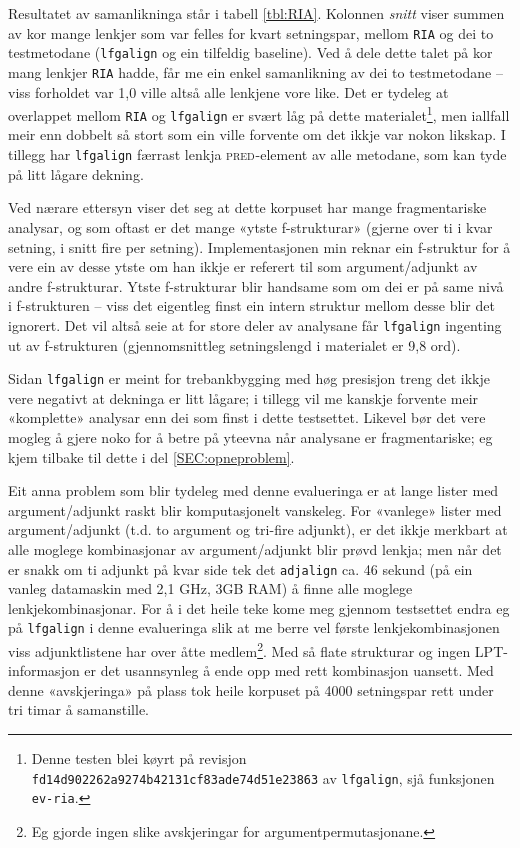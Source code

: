 \documentclass[11pt,a4paper,oneside,draft]{book}
\newcommand{\F}[2]{\textsc{#1}\ensuremath{_{#2}}}
\newcommand{\PRED}{\F{pred}{}}
\begin{document}
 Resultatet av samanlikninga står i tabell \ref{tbl:RIA}. Kolonnen
 \emph{snitt} viser summen av kor mange lenkjer som var felles for kvart
 setningspar, mellom \texttt{RIA} og dei to testmetodane (\texttt{lfgalign} og ein
 tilfeldig baseline). Ved å dele dette talet på kor mang lenkjer \texttt{RIA}
 hadde, får me ein enkel samanlikning av dei to testmetodane -- viss
 forholdet var 1,0 ville altså alle lenkjene vore like.  Det er
 tydeleg at overlappet mellom \texttt{RIA} og \texttt{lfgalign} er svært låg på
 dette materialet\footnote{Denne testen blei køyrt på revisjon
        \texttt{fd14d902262a9274b42131cf83ade74d51e23863} av \texttt{lfgalign},
        sjå funksjonen \texttt{ev-ria}. }, men iallfall meir enn dobbelt så stort som
 ein ville forvente om det ikkje var nokon likskap. I tillegg har
 \texttt{lfgalign} færrast lenkja \PRED{}-element av alle metodane, som kan
 tyde på litt lågare dekning.

 Ved nærare ettersyn viser det seg at dette korpuset har mange
 fragmentariske analysar, og som oftast er det mange «ytste
 f-strukturar» (gjerne over ti i kvar setning, i snitt fire per
 setning). Implementasjonen min reknar ein f-struktur for å vere ein
 av desse ytste om han ikkje er referert til som argument/adjunkt av
 andre f-strukturar. Ytste f-strukturar blir handsame som om dei er på
 same nivå i f-strukturen -- viss det eigentleg finst ein intern
 struktur mellom desse blir det ignorert. Det vil altså seie at for
 store deler av analysane får \texttt{lfgalign} ingenting ut av f-strukturen
 (gjennomsnittleg setningslengd i materialet er 9,8 ord).

 Sidan \texttt{lfgalign} er meint for trebankbygging med høg presisjon treng
 det ikkje vere negativt at dekninga er litt lågare; i tillegg vil me
 kanskje forvente meir «komplette» analysar enn dei som finst i dette
 testsettet. Likevel bør det vere mogleg å gjere noko for å betre på
 yteevna når analysane er fragmentariske; eg kjem tilbake til dette i
 del \ref{SEC:opneproblem}.

 Eit anna problem som blir tydeleg med denne evalueringa er at lange
 lister med argument/adjunkt raskt blir komputasjonelt vanskeleg. For
 «vanlege» lister med argument/adjunkt (t.d. to argument og tri-fire
 adjunkt), er det ikkje merkbart at alle moglege kombinasjonar av
 argument/adjunkt blir prøvd lenkja; men når det er snakk om ti
 adjunkt på kvar side tek det \texttt{adjalign} ca. 46 sekund (på ein vanleg
 datamaskin med 2,1 GHz, 3GB RAM) å finne alle moglege
 lenkjekombinasjonar. For å i det heile teke kome meg gjennom
 testsettet endra eg på \texttt{lfgalign} i denne evalueringa slik at me
 berre vel første lenkjekombinasjonen viss adjunktlistene har over
 åtte medlem\footnote{Eg gjorde ingen slike avskjeringar for argumentpermutasjonane. }. Med så flate strukturar og ingen LPT-informasjon
 er det usannsynleg å ende opp med rett kombinasjon uansett. Med denne
 «avskjeringa» på plass tok heile korpuset på 4000 setningspar rett
 under tri timar å samanstille.
\end{document}
